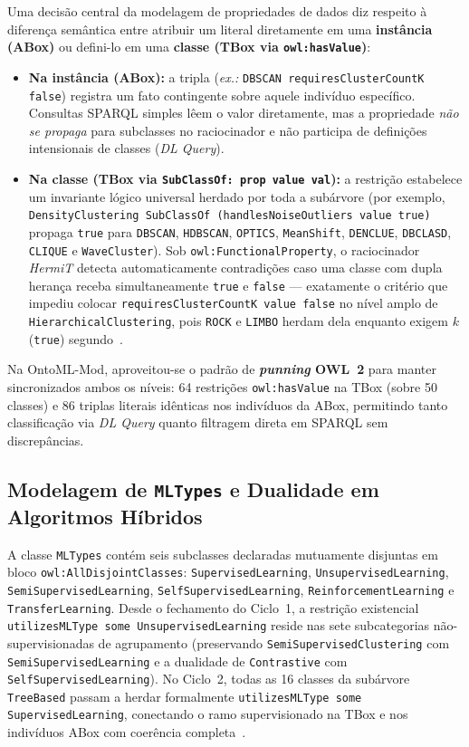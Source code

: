 \documentclass[11pt,a4paper]{article}
\newcommand{\onto}[1]{\texttt{#1}}
\begin{document}
Uma decisão central da modelagem de propriedades de dados diz respeito à diferença semântica entre atribuir um literal diretamente em uma \textbf{instância (ABox)} ou defini-lo em uma \textbf{classe (TBox via \onto{owl:hasValue})}:
\begin{itemize}[leftmargin=*,nosep]
  \item \textbf{Na instância (ABox):} a tripla (\emph{ex.:} \onto{DBSCAN requiresClusterCountK false}) registra um fato contingente sobre aquele indivíduo específico. Consultas SPARQL simples lêem o valor diretamente, mas a propriedade \emph{não se propaga} para subclasses no raciocinador e não participa de definições intensionais de classes (\emph{DL Query}).
  \item \textbf{Na classe (TBox via \onto{SubClassOf: prop value val}):} a restrição estabelece um invariante lógico universal herdado por toda a subárvore (por exemplo, \onto{DensityClustering SubClassOf (handlesNoiseOutliers value true)} propaga \onto{true} para \onto{DBSCAN}, \onto{HDBSCAN}, \onto{OPTICS}, \onto{MeanShift}, \onto{DENCLUE}, \onto{DBCLASD}, \onto{CLIQUE} e \onto{WaveCluster}). Sob \onto{owl:FunctionalProperty}, o raciocinador \emph{HermiT} detecta automaticamente contradições caso uma classe com dupla herança receba simultaneamente \onto{true} e \onto{false} --- exatamente o critério que impediu colocar \onto{requiresClusterCountK value false} no nível amplo de \onto{HierarchicalClustering}, pois \onto{ROCK} e \onto{LIMBO} herdam dela enquanto exigem $k$ (\onto{true}) segundo~\cite{nagpal2013review}.
\end{itemize}
Na OntoML-Mod, aproveitou-se o padrão de \textbf{\emph{punning} OWL~2} para manter sincronizados ambos os níveis: 64 restrições \onto{owl:hasValue} na TBox (sobre 50 classes) e 86 triplas literais idênticas nos indivíduos da ABox, permitindo tanto classificação via \emph{DL Query} quanto filtragem direta em SPARQL sem discrepâncias.

\subsection{Modelagem de \onto{MLTypes} e Dualidade em Algoritmos Híbridos}

A classe \onto{MLTypes} contém seis subclasses declaradas mutuamente disjuntas em bloco \onto{owl:AllDisjointClasses}: \onto{SupervisedLearning}, \onto{UnsupervisedLearning}, \onto{SemiSupervisedLearning}, \onto{SelfSupervisedLearning}, \onto{ReinforcementLearning} e \onto{TransferLearning}. Desde o fechamento do Ciclo~1, a restrição existencial \onto{utilizesMLType some UnsupervisedLearning} reside nas sete subcategorias não-supervisionadas de agrupamento (preservando \onto{SemiSupervisedClustering} com \onto{SemiSupervisedLearning} e a dualidade de \onto{Contrastive} com \onto{SelfSupervisedLearning}). No Ciclo~2, todas as 16 classes da subárvore \onto{TreeBased} passam a herdar formalmente \onto{utilizesMLType some SupervisedLearning}, conectando o ramo supervisionado na TBox e nos indivíduos ABox com coerência completa~\cite{sarker2021ml,liu2023self}.
\end{document}
